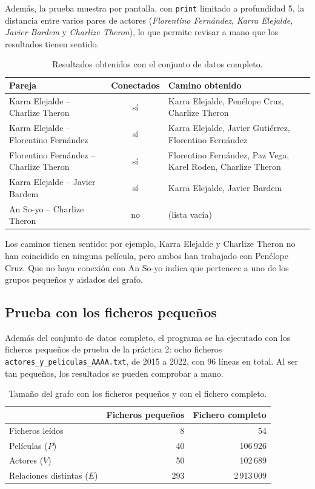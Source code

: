 \documentclass[a4paper,11pt]{report}
\begin{document}
Además, la prueba muestra por pantalla, con \texttt{print} limitado a profundidad 5, la distancia entre varios pares de actores (\textit{Florentino Fernández}, \textit{Karra Elejalde}, \textit{Javier Bardem} y \textit{Charlize Theron}), lo que permite revisar a mano que los resultados tienen sentido.

\begin{table}[ht]
\centering
\begin{tabular}{p{4.3cm} c p{6.6cm}}
\toprule
Pareja & Conectados & Camino obtenido \\
\midrule
Karra Elejalde -- Charlize Theron & sí & Karra Elejalde, Penélope Cruz, Charlize Theron \\
Karra Elejalde -- Florentino Fernández & sí & Karra Elejalde, Javier Gutiérrez, Florentino Fernández \\
Florentino Fernández -- Charlize Theron & sí & Florentino Fernández, Paz Vega, Karel Roden, Charlize Theron \\
Karra Elejalde -- Javier Bardem & sí & Karra Elejalde, Javier Bardem \\
An So-yo -- Charlize Theron & no & (lista vacía) \\
\bottomrule
\end{tabular}
\caption{Resultados obtenidos con el conjunto de datos completo.}
\end{table}

Los caminos tienen sentido: por ejemplo, Karra Elejalde y Charlize Theron no han coincidido en ninguna película, pero ambos han trabajado con Penélope Cruz. Que no haya conexión con An So-yo indica que pertenece a uno de los grupos pequeños y aislados del grafo.

\subsection*{Prueba con los ficheros pequeños}

Además del conjunto de datos completo, el programa se ha ejecutado con los ficheros pequeños de prueba de la práctica 2: ocho ficheros \texttt{actores\_y\_\allowbreak peliculas\_AAAA.txt}, de 2015 a 2022, con 96 líneas en total. Al ser tan pequeños, los resultados se pueden comprobar a mano.

\begin{table}[ht]
\centering
\begin{tabular}{l r r}
\toprule
 & Ficheros pequeños & Fichero completo \\
\midrule
Ficheros leídos & 8 & 54 \\
Películas ($P$) & 40 & 106\,926 \\
Actores ($V$) & 50 & 102\,689 \\
Relaciones distintas ($E$) & 293 & 2\,913\,009 \\
\bottomrule
\end{tabular}
\caption{Tamaño del grafo con los ficheros pequeños y con el fichero completo.}
\end{table}
\end{document}
